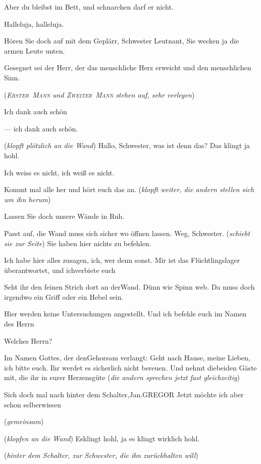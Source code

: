 \documentclass[
	final,
	a4paper,
	ngerman,
	mpinclude = true, %
	twoside = true,
	open = right,
	cleardoublepage = plain,
	DIV = 13,
	BCOR = 1cm,
	titlepage = firstiscover,
	]{scrbook}
\newcommand{\direction}[1]{(\textit{#1})}
\newcommand{\thecharacter}[1]{\textup{\textsc{#1}}\xspace}
\newcommand{\theJan}{\thecharacter{Jan}}
\newcommand{\theLuise}{\thecharacter{Luise}}
\newcommand{\theErsterMann}{\thecharacter{Erster~Mann}}
\newcommand{\theZweiterMann}{\thecharacter{Zweiter~Mann}}
\newcommand{\character}[1]{\item[#1]}
\newcommand{\Jan}{\character{\theJan}}
\newcommand{\Luise}{\character{\theLuise}}
\newcommand{\Heilsarmeeschwester}{\character{Schwester}}
\newcommand{\ErsterMann}{\character{1. Mann}}
\newcommand{\ZweiterMann}{\character{2. Mann}}
\begin{document}
\begin{play}
\Jan
Aber du bleibst im Bett, und schnarchen darf er nicht.

\Heilsarmeeschwester
Halleluja, halleluja.

\Jan
Hören Sie doch auf mit dem Geplärr, Schwester Leutnant, Sie wecken ja die armen Leute unten.

\Heilsarmeeschwester
Gesegnet sei der Herr, der das menschliche Herz erweicht und den menschlichen Sinn.

\direction{\theErsterMann und \theZweiterMann stehen auf, sehr verlegen}

\ErsterMann
Ich dank auch schön

\ZweiterMann
--- ich dank auch schön.

\Jan
\direction{klopft plötzlich an die Wand} Hallo, Schwester, was ist denn das? Das klingt ja hohl.

\Heilsarmeeschwester
Ich weiss es nicht, ich weiß es nicht.

\Jan
Kommt mal alle her und hört euch das an. \direction{klopft weiter, die andern stellen sich um ihn herum}

\Heilsarmeeschwester
Lassen Sie doch unsere Wände in Ruh.

\Jan
Passt auf, die Wand muss sich sicher wo öffnen lassen. Weg, Schwester. \direction{schiebt sie zur Seite} Sie haben hier nichts zu befehlen.

\Heilsarmeeschwester
Ich habe hier alles zusagen, ich, wer denn sonst. Mir ist das Flüchtlingslager überantwortet, und ichverbiete euch

\Jan
Seht ihr den feinen Strich dort an derWand. Dünn wie Spinn web. Da muss doch irgendwo ein Griff oder ein Hebel sein.

\Heilsarmeeschwester
Hier werden keine Untersuchungen angestellt. Und ich befehle euch im Namen des Herrn

\Jan
Welches Herrn?

\Heilsarmeeschwester
Im Namen Gottes, der denGehorsam verlangt: Geht nach Hause, meine Lieben, ich bitte euch. Ihr werdet es sicherlich nicht bereuen. Und nehmt diebeiden Gäste mit, die ihr in eurer Herzensgüte \direction{die andern sprechen jetzt fast gleichzeitig}

\Luise
Sich doch mal nach hinter dem Schalter,Jan.GREGOR Jetzt möchte ich aber schon selberwissen

\ErsterMann \direction{gemeinsam}
\ZweiterMann
\direction{klopfen an die Wand} Esklingt hohl, ja es klingt wirklich hohl.

\Jan
\direction{hinter dem Schalter, zur Schwester, die ihn zurückhalten will}


\end{play}
\end{document}
